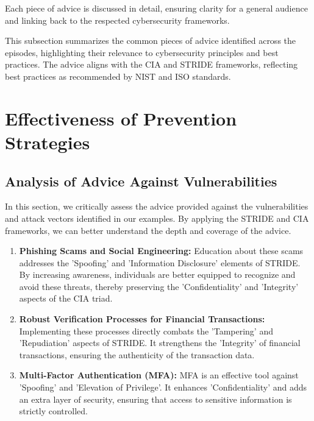 \documentclass[11pt]{article}
\begin{document}
Each piece of advice is discussed in detail, ensuring clarity for a general audience and linking back to the respected cybersecurity frameworks.

This subsection summarizes the common pieces of advice identified across the episodes, highlighting their relevance to cybersecurity principles and best practices. The advice aligns with the CIA and STRIDE frameworks, reflecting best practices as recommended by NIST and ISO standards.

\section{Effectiveness of Prevention Strategies}
\subsection{Analysis of Advice Against Vulnerabilities}
In this section, we critically assess the advice provided against the vulnerabilities and attack vectors identified in our examples. By applying the STRIDE and CIA frameworks, we can better understand the depth and coverage of the advice.

\begin{enumerate}
    \item \textbf{Phishing Scams and Social Engineering:} Education about these scams addresses the 'Spoofing' and 'Information Disclosure' elements of STRIDE. By increasing awareness, individuals are better equipped to recognize and avoid these threats, thereby preserving the 'Confidentiality' and 'Integrity' aspects of the CIA triad.
    \item \textbf{Robust Verification Processes for Financial Transactions:} Implementing these processes directly combats the 'Tampering' and 'Repudiation' aspects of STRIDE. It strengthens the 'Integrity' of financial transactions, ensuring the authenticity of the transaction data.
    \item \textbf{Multi-Factor Authentication (MFA):} MFA is an effective tool against 'Spoofing' and 'Elevation of Privilege'. It enhances 'Confidentiality' and adds an extra layer of security, ensuring that access to sensitive information is strictly controlled.
\end{enumerate}
\end{document}
